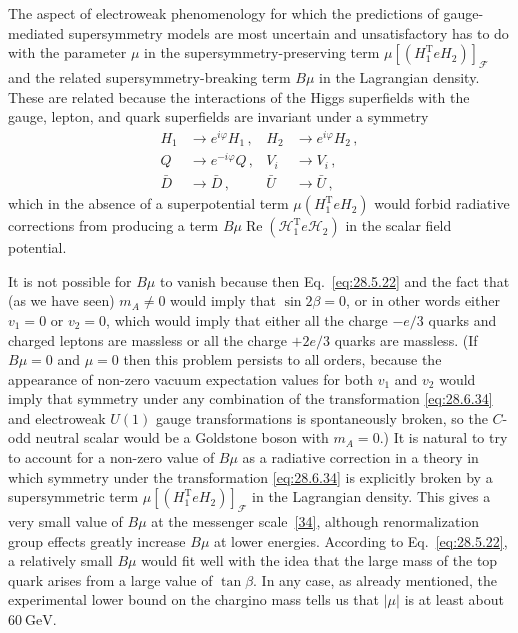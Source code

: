 The aspect of electroweak phenomenology for which the predictions of
gauge-mediated supersymmetry models are most uncertain and unsatisfactory
has to do with the parameter \(\mu\) in the supersymmetry-preserving term
\(\mu[(H_1^{\mathrm{T}}eH_2)]_{\mathcal{F}}\) and the related
supersymmetry-breaking term \(B\mu\) in the Lagrangian density. These are
related because the interactions of the Higgs superfields with the gauge,
lepton, and quark superfields are invariant under a symmetry
\begin{equation}
  \begin{aligned}
    H_1&\longrightarrow e^{i\varphi}H_1\,,
      &H_2&\longrightarrow e^{i\varphi}H_2\,,\\
    Q&\longrightarrow e^{-i\varphi}Q\,,
      &V_i&\longrightarrow V_i\,,\\
    \bar D&\longrightarrow\bar D\,,
      &\bar U&\longrightarrow\bar U\,,
  \end{aligned}
  \tag{28.6.34}\label{eq:28.6.34}
\end{equation}
which in the absence of a superpotential term
\(\mu(H_1^{\mathrm{T}}eH_2)\) would forbid radiative corrections from
producing a term
\(B\mu\operatorname{Re}(\mathcal{H}_1^{\mathrm{T}}e\mathcal{H}_2)\) in
the scalar field potential.

It is not possible for \(B\mu\) to vanish because then
Eq.~\eqref{eq:28.5.22} and the fact that (as we have seen) \(m_A\neq0\)
would imply that \(\sin2\beta=0\), or in other words either \(v_1=0\) or
\(v_2=0\), which would imply that either all the charge \(-e/3\) quarks
and charged leptons are massless or all the charge \(+2e/3\) quarks are
massless. (If \(B\mu=0\) and \(\mu=0\) then this problem persists to all
orders, because the appearance of non-zero vacuum expectation values for
both \(v_1\) and \(v_2\) would imply that symmetry under any combination
of the transformation \eqref{eq:28.6.34} and electroweak \(U(1)\) gauge
transformations is spontaneously broken, so the \(C\)-odd neutral scalar
would be a Goldstone boson with \(m_A=0\).) It is natural to try to account
for a non-zero value of \(B\mu\) as a radiative correction in a theory in
which symmetry under the transformation \eqref{eq:28.6.34} is explicitly
broken by a supersymmetric term
\(\mu[(H_1^{\mathrm{T}}eH_2)]_{\mathcal{F}}\) in the Lagrangian density.
This gives a very small value of \(B\mu\) at the messenger
scale~\hyperref[ch28-ref-34]{[34]}, although renormalization group effects
greatly increase \(B\mu\) at lower energies. According to
Eq.~\eqref{eq:28.5.22}, a relatively small \(B\mu\) would fit well with
the idea that the large mass of the top quark arises from a large value of
\(\tan\beta\). In any case, as already mentioned, the experimental lower
bound on the chargino mass tells us that \(\lvert\mu\rvert\) is at least
about \(60\ \mathrm{GeV}\).

